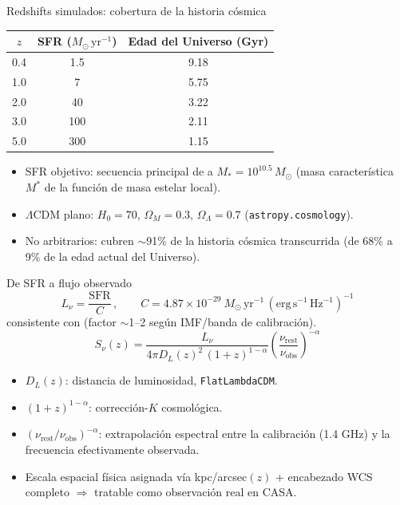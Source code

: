 \documentclass[12pt,aspectratio=169]{beamer}
\begin{document}
\begin{frame}{Redshifts simulados: cobertura de la historia cósmica}
    \begin{center}
    \begin{tabular}{ccc}
    \toprule
    $z$ & SFR ($M_\odot\,\mathrm{yr^{-1}}$) & Edad del Universo (Gyr) \\
    \midrule
    0.4 & 1.5  & 9.18 \\
    1.0 & 7    & 5.75 \\
    2.0 & 40   & 3.22 \\
    3.0 & 100  & 2.11 \\
    5.0 & 300  & 1.15 \\
    \bottomrule
    \end{tabular}
    \end{center}
    \begin{itemize}
        \item SFR objetivo: secuencia principal de \citet{leslie2020} a
        $M_*=10^{10.5}\,M_\odot$ (masa característica $M^*$ de la función
        de masa estelar local).
        \item $\Lambda$CDM plano: $H_0=70$, $\Omega_M=0.3$,
        $\Omega_\Lambda=0.7$ (\texttt{astropy.cosmology}).
        \item No arbitrarios: cubren $\sim$91\% de la historia cósmica
        transcurrida (de 68\% a 9\% de la edad actual del Universo).
    \end{itemize}
\end{frame}

\begin{frame}{De SFR a flujo observado}
    \begin{equation*}
        L_\nu = \frac{\mathrm{SFR}}{C}\, ,\qquad
        C = 4.87\times10^{-29}\ M_\odot\,\mathrm{yr^{-1}}\,(\mathrm{erg\,s^{-1}\,Hz^{-1}})^{-1}
    \end{equation*}
    \vspace{-4pt}
    consistente con \citet{condon1992,bell2003,murphy2011} (factor
    $\sim$1--2 según IMF/banda de calibración).
    \begin{equation*}
        S_\nu(z) = \frac{L_\nu}{4\pi D_L(z)^2\,(1+z)^{1-\alpha}}
        \left(\frac{\nu_{\mathrm{rest}}}{\nu_{\mathrm{obs}}}\right)^{-\alpha}
    \end{equation*}
    \begin{itemize}
        \item $D_L(z)$: distancia de luminosidad, \texttt{FlatLambdaCDM}.
        \item $(1+z)^{1-\alpha}$: corrección-$K$ cosmológica.
        \item $(\nu_{\mathrm{rest}}/\nu_{\mathrm{obs}})^{-\alpha}$:
        extrapolación espectral entre la calibración (1.4 GHz) y la
        frecuencia efectivamente observada.
        \item Escala espacial física asignada vía kpc/arcsec$(z)$ +
        encabezado WCS completo $\Rightarrow$ tratable como observación
        real en CASA.
    \end{itemize}
\end{frame}
\end{document}
